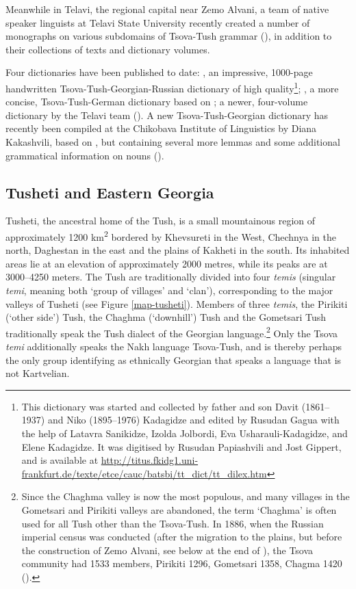 Meanwhile in Telavi, the regional capital near Zemo Alvani, a team of native speaker linguists at Telavi State University recently created a number of monographs on various  subdomains of Tsova-Tush grammar (\cite{mikeladze08interf,mikeladze11,mikeladze13verb,gigashvili16cs,bertlani12phon}), in addition to their collections of texts and dictionary volumes. 

Four dictionaries have been published to date: \textcite{kadkad84}, an impressive, 1000-page handwritten Tsova-Tush-Georgian-Russian dictionary of high quality\footnote{This dictionary was started and collected by father and son Davit (1861--1937) and Niko (1895--1976) Kadagidze and edited by Rusudan Gagua with the help of Latavra Sanikidze, Izolda Jolbordi, Eva Usharauli-Kadagidze, and Elene Kadagidze. It was digitised by Rusudan Papiashvili and Jost Gippert, and is available at \url{http://titus.fkidg1.uni-frankfurt.de/texte/etce/cauc/batsbi/tt_dict/tt_dilex.htm}}; \textcite{faehnrich01dict}, a more concise, Tsova-Tush-German dictionary based on \textcite{kadkad84}; a newer, four-volume dictionary by the Telavi team (\cite{teldict1,teldict2,teldict3,telavi2019tsovatushdict4}). A new Tsova-Tush-Georgian dictionary has recently been compiled at the Chikobava Institute of Linguistics by Diana Kakashvili, based on \textcite{kadkad84}, but containing several more lemmas and some additional grammatical information on nouns (\cite{kakashvili2022dict,kakashvili19aboutdict}).



\subsection{Tusheti and Eastern Georgia} \label{tusheti}

Tusheti, the ancestral home of the Tush, is a small mountainous region of approximately 1200 km\textsuperscript{2} bordered by Khevsureti in the West, Chechnya in the north, Daghestan in the east and the plains of Kakheti in the south. Its inhabited areas lie at an elevation of approximately 2000 metres, while its peaks are at 3000--4250 meters. The Tush are traditionally divided into four \textit{temis} (singular \textit{temi}, meaning both `group of villages' and `clan'), corresponding to the major valleys of Tusheti (see Figure \ref{map-tusheti}). Members of three \textit{temis}, the Pirikiti (`other side') Tush, the Chaghma (`downhill') Tush and the Gometsari Tush traditionally speak the Tush dialect of the Georgian language.\footnote{Since the Chaghma valley is now the most populous, and many villages in the Gometsari and Pirikiti valleys are abandoned, the term `Chaghma' is often used for all Tush other than the Tsova-Tush. In 1886, when the Russian imperial census was conducted (after the migration to the plains, but before the construction of Zemo Alvani, see below at the end of ), the Tsova community had 1533 members, Pirikiti 1296, Gometsari 1358, Chagma 1420 (\cite{statistics1893}).} Only the Tsova \textit{temi} additionally speaks the Nakh language Tsova-Tush, and is thereby perhaps the only group identifying as ethnically Georgian that speaks a language that is not Kartvelian.



